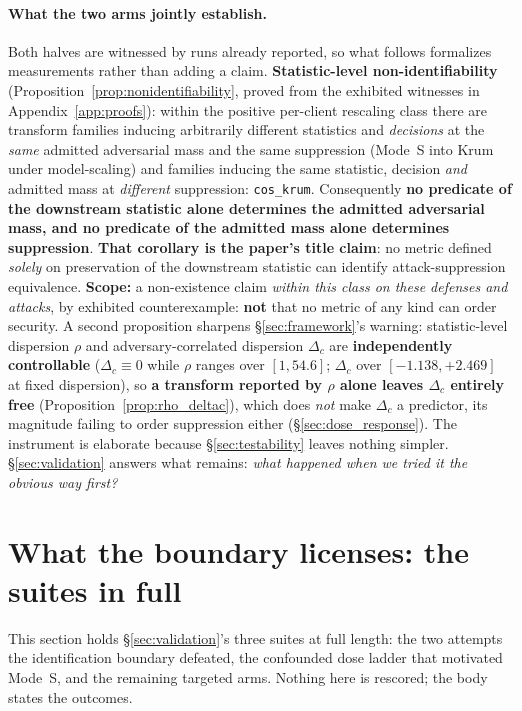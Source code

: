 \documentclass{article}
\begin{document}
\paragraph{What the two arms jointly establish.} Both halves are witnessed by runs already reported, so what follows formalizes measurements rather than adding a claim. \textbf{Statistic-level non-identifiability} (Proposition~\ref{prop:nonidentifiability}, proved from the exhibited witnesses in Appendix~\ref{app:proofs}): within the positive per-client rescaling class there are transform families inducing arbitrarily different statistics and \emph{decisions} at the \emph{same} admitted adversarial mass and the same suppression (Mode~S into Krum under model-scaling) and families inducing the same statistic, decision \emph{and} admitted mass at \emph{different} suppression: \texttt{cos\_krum}. Consequently \textbf{no predicate of the downstream statistic alone determines the admitted adversarial mass, and no predicate of the admitted mass alone determines suppression}. \textbf{That corollary is the paper's title claim}: no metric defined \emph{solely} on preservation of the downstream statistic can identify attack-suppression equivalence. \textbf{Scope:} a non-existence claim \emph{within this class on these defenses and attacks}, by exhibited counterexample: \textbf{not} that no metric of any kind can order security. A second proposition sharpens \S\ref{sec:framework}'s warning: statistic-level dispersion $\rho$ and adversary-correlated dispersion $\Delta_c$ are \textbf{independently controllable} ($\Delta_c \equiv 0$ while $\rho$ ranges over $[1,54.6]$; $\Delta_c$ over $[-1.138,+2.469]$ at fixed dispersion), so \textbf{a transform reported by $\rho$ alone leaves $\Delta_c$ entirely free} (Proposition~\ref{prop:rho_deltac}), which does \emph{not} make $\Delta_c$ a predictor, its magnitude failing to order suppression either (\S\ref{sec:dose_response}). The instrument is elaborate because \S\ref{sec:testability} leaves nothing simpler. \S\ref{sec:validation} answers what remains: \emph{what happened when we tried it the obvious way first?}

\section{What the boundary licenses: the suites in full}
\label{app:validation_full}

This section holds \S\ref{sec:validation}'s three suites at full length: the two attempts the identification boundary defeated, the confounded dose ladder that motivated Mode~S, and the remaining targeted arms. Nothing here is rescored; the body states the outcomes.
\end{document}
